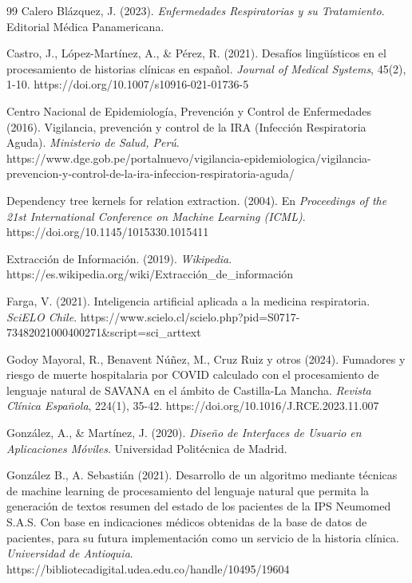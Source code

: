 \documentclass[12pt,a4paper]{article}
\begin{document}
\begin{thebibliography}{99}
Calero Blázquez, J. (2023). \textit{Enfermedades Respiratorias y su Tratamiento}. Editorial Médica Panamericana.

Castro, J., López-Martínez, A., \& Pérez, R. (2021). Desafíos lingüísticos en el procesamiento de historias clínicas en español. \textit{Journal of Medical Systems}, 45(2), 1-10. https://doi.org/10.1007/s10916-021-01736-5

Centro Nacional de Epidemiología, Prevención y Control de Enfermedades (2016). Vigilancia, prevención y control de la IRA (Infección Respiratoria Aguda). \textit{Ministerio de Salud, Perú}. https://www.dge.gob.pe/portalnuevo/vigilancia-epidemiologica/vigilancia-prevencion-y-control-de-la-ira-infeccion-respiratoria-aguda/

Dependency tree kernels for relation extraction. (2004). En \textit{Proceedings of the 21st International Conference on Machine Learning (ICML)}. https://doi.org/10.1145/1015330.1015411

Extracción de Información. (2019). \textit{Wikipedia}. https://es.wikipedia.org/wiki/Extracción\_de\_información

Farga, V. (2021). Inteligencia artificial aplicada a la medicina respiratoria. \textit{SciELO Chile}. https://www.scielo.cl/scielo.php?pid=S0717-73482021000400271\&script=sci\_arttext

Godoy Mayoral, R., Benavent Núñez, M., Cruz Ruiz y otros (2024). Fumadores y riesgo de muerte hospitalaria por COVID calculado con el procesamiento de lenguaje natural de SAVANA en el ámbito de Castilla-La Mancha. \textit{Revista Clínica Española}, 224(1), 35-42. https://doi.org/10.1016/J.RCE.2023.11.007

González, A., \& Martínez, J. (2020). \textit{Diseño de Interfaces de Usuario en Aplicaciones Móviles}. Universidad Politécnica de Madrid.

González B., A. Sebastián (2021). Desarrollo de un algoritmo mediante técnicas de machine learning de procesamiento del lenguaje natural que permita la generación de textos resumen del estado de los pacientes de la IPS Neumomed S.A.S. Con base en indicaciones médicos obtenidas de la base de datos de pacientes, para su futura implementación como un servicio de la historia clínica. \textit{Universidad de Antioquia}. https://bibliotecadigital.udea.edu.co/handle/10495/19604


\end{thebibliography}
\end{document}
